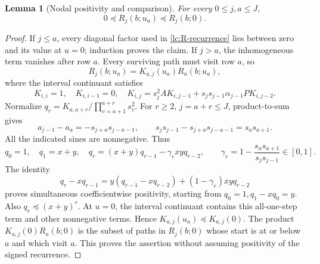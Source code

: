 \documentclass[11pt]{article}
\numberwithin{equation}{section}
\newtheorem{lemma}[theorem]{Lemma}
\theoremstyle{remark}\newtheorem{remark}[theorem]{Remark}
\newcommand{\coefle}{\preccurlyeq}
\begin{document}
\begin{lemma}[Nodal positivity and comparison]\label{lc:nodal-positive}
For every \(0\le j,a\le J\),
\[
                    0\coefle R_j(b;u_a)\coefle R_j(b;0).
\]
\end{lemma}
\begin{proof}
If \(j\le a\), every diagonal factor used in \eqref{lc:R-recurrence}
lies between zero and its value at \(u=0\); induction proves the claim.
If \(j>a\), the inhomogeneous term vanishes after row \(a\).
Every surviving path must visit row \(a\), so
\[
                    R_j(b;u_a)=K_{a,j}(u_a)R_a(b;u_a),
\]
where the interval continuant satisfies
\[
 K_{i,i}=1,\quad K_{i,i-1}=0,\quad
 K_{i,j}=s_j^2A K_{i,j-1}+s_js_{j-1}\alpha_{j-1}P K_{i,j-2}.
\]
Normalize \(q_r=K_{a,a+r}/\prod_{v=a+1}^{a+r}s_v^2\).
For \(r\ge2\), \(j=a+r\le J\), product-to-sum gives
\[
 a_{j-1}-a_a=-s_{j+a}s_{j-a-1},\qquad
 s_js_{j-1}-s_{j+a}s_{j-a-1}=s_as_{a+1}.
\]
All the indicated sines are nonnegative. Thus
\begin{equation}\label{lc:tail-node}
 q_0=1,\quad q_1=x+y,\quad
 q_r=(x+y)q_{r-1}-\gamma_rxyq_{r-2},\qquad
 \gamma_r=1-\frac{s_as_{a+1}}{s_js_{j-1}}\in[0,1].
\end{equation}
The identity
\[
 q_r-xq_{r-1}
 =y(q_{r-1}-xq_{r-2})+(1-\gamma_r)xyq_{r-2}
\]
proves simultaneous coefficientwise positivity, starting from
\(q_0=1,q_1-xq_0=y\). Also \(q_r\coefle(x+y)^r\).
At \(u=0\), the interval continuant contains this all-one-step term
and other nonnegative terms. Hence \(K_{a,j}(u_a)\coefle K_{a,j}(0)\).
The product \(K_{a,j}(0)R_a(b;0)\) is the subset of paths in \(R_j(b;0)\)
whose start is at or below \(a\) and which visit \(a\). This proves
the assertion without assuming positivity of the signed recurrence.
\end{proof}
\end{document}
